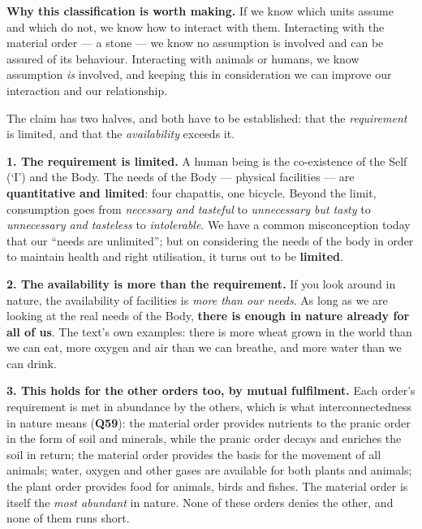 \textbf{Why this classification is worth making.} If we know which units assume
and which do not, we know how to interact with them. Interacting with the
material order --- a stone --- we know no assumption is involved and can be
assured of its behaviour. Interacting with animals or humans, we know
assumption \emph{is} involved, and keeping this in consideration we can
improve our interaction and our relationship.


\ans The claim has two halves, and both have to be established: that the
\emph{requirement} is limited, and that the \emph{availability} exceeds it.

\textbf{1. The requirement is limited.} A human being is the co-existence of
the Self (`I') and the Body. The needs of the Body --- physical facilities ---
are \textbf{quantitative and limited}: four chapattis, one bicycle. Beyond the
limit, consumption goes from \emph{necessary and tasteful} to
\emph{unnecessary but tasty} to \emph{unnecessary and tasteless} to
\emph{intolerable}. We have a common misconception today that our ``needs are
unlimited''; but on considering the needs of the body in order to maintain
health and right utilisation, it turns out to be \textbf{limited}.

\textbf{2. The availability is more than the requirement.} If you look around
in nature, the availability of facilities is \emph{more than our needs}. As
long as we are looking at the real needs of the Body, \textbf{there is enough
in nature already for all of us}. The text's own examples: there is more wheat
grown in the world than we can eat, more oxygen and air than we can breathe,
and more water than we can drink.

\textbf{3. This holds for the other orders too, by mutual fulfilment.} Each
order's requirement is met in abundance by the others, which is what
interconnectedness in nature means (\textbf{Q59}): the material order provides
nutrients to the pranic order in the form of soil and minerals, while the
pranic order decays and enriches the soil in return; the material order
provides the basis for the movement of all animals; water, oxygen and other
gases are available for both plants and animals; the plant order provides food
for animals, birds and fishes. The material order is itself the \emph{most
abundant} in nature. None of these orders denies the other, and none of them
runs short.

